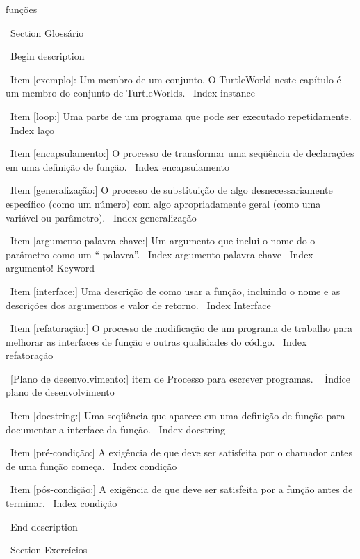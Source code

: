 \documentclass[10pt]{book}
\begin{document}
{%
funções%


\ Section {} Glossário

\ Begin {description}

\ Item [exemplo]: Um membro de um conjunto. O TurtleWorld neste
capítulo é um membro do conjunto de TurtleWorlds.
\ Index {instance}

\ Item [loop:] Uma parte de um programa que pode ser executado repetidamente.
\ Index {laço}

\ Item [encapsulamento:] O processo de transformar uma seqüência de
declarações em uma definição de função.
\ Index {} encapsulamento

\ Item [generalização:] O processo de substituição de algo
desnecessariamente específico (como um número) com algo apropriadamente
geral (como uma variável ou parâmetro).
\ Index {generalização}

\ Item [argumento palavra-chave:] Um argumento que inclui o nome do
o parâmetro como um `` palavra''.
\ Index {argumento palavra-chave}
\ Index {argumento! Keyword}

\ Item [interface:] Uma descrição de como usar a função, incluindo
o nome e as descrições dos argumentos e valor de retorno.
\ Index {Interface}

\ Item [refatoração:] O processo de modificação de um programa de trabalho para
  melhorar as interfaces de função e outras qualidades do código.
\ Index {} refatoração

\ [Plano de desenvolvimento:] item de Processo para escrever programas.
\ {} Índice plano de desenvolvimento

\ Item [docstring:] Uma seqüência que aparece em uma definição de função
para documentar a interface da função.
\ Index {} docstring

\ Item [pré-condição:] A exigência de que deve ser satisfeita por
o chamador antes de uma função começa.
\ Index {condição}

\ Item [pós-condição:] A exigência de que deve ser satisfeita por
a função antes de terminar.
\ Index {condição}

\ End {description}


\ Section {Exercícios}

}
\end{document}
